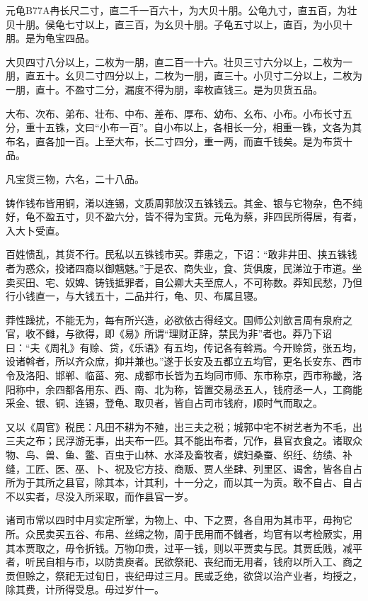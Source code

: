 \documentclass[]{article}
\begin{document}
元龟B77A冉长尺二寸，直二千一百六十，为大贝十朋。公龟九寸，直五百，为壮贝十朋。侯龟七寸以上，直三百，为幺贝十朋。子龟五寸以上，直百，为小贝十朋。是为龟宝四品。

大贝四寸八分以上，二枚为一朋，直二百一十六。壮贝三寸六分以上，二枚为一朋，直五十。幺贝二寸四分以上，二枚为一朋，直三十。小贝寸二分以上，二枚为一朋，直十。不盈寸二分，漏度不得为朋，率枚直钱三。是为贝货五品。

大布、次布、弟布、壮布、中布、差布、厚布、幼布、幺布、小布。小布长寸五分，重十五铢，文曰``小布一百''。自小布以上，各相长一分，相重一铢，文各为其布名，直各加一百。上至大布，长二寸四分，重一两，而直千钱矣。是为布货十品。

凡宝货三物，六名，二十八品。

铸作钱布皆用铜，淆以连锡，文质周郭放汉五铢钱云。其金、银与它物杂，色不纯好，龟不盈五寸，贝不盈六分，皆不得为宝货。元龟为蔡，非四民所得居，有者，入大卜受直。

百姓愦乱，其货不行。民私以五铢钱市买。莽患之，下诏：``敢非井田、挟五铢钱者为惑众，投诸四裔以御魑魅。''于是农、商失业，食、货俱废，民涕泣于市道。坐卖买田、宅、奴婢、铸钱抵罪者，自公卿大夫至庶人，不可称数。莽知民愁，乃但行小钱直一，与大钱五十，二品并行，龟、贝、布属且寝。

莽性躁扰，不能无为，每有所兴造，必欲依古得经文。国师公刘歆言周有泉府之官，收不雠，与欲得，即《易》所谓``理财正辞，禁民为非''者也。莽乃下诏曰：``夫《周礼》有赊、贷，《乐语》有五均，传记各有斡焉。今开赊贷，张五均，设诸斡者，所以齐众庶，抑并兼也。''遂于长安及五都立五均官，更名长安东、西市令及洛阳、邯郸、临菑、宛、成都市长皆为五均同市师、东市称京，西市称畿，洛阳称中，余四都各用东、西、南、北为称，皆置交易丞五人，钱府丞一人，工商能采金、银、铜、连锡，登龟、取贝者，皆自占司市钱府，顺时气而取之。

又以《周官》税民：凡田不耕为不殖，出三夫之税；城郭中宅不树艺者为不毛，出三夫之布；民浮游无事，出夫布一匹。其不能出布者，冗作，县官衣食之。诸取众物、鸟、兽、鱼、鳖、百虫于山林、水泽及畜牧者，嫔妇桑蚕、织纴、纺绩、补缝，工匠、医、巫、卜、祝及它方技、商贩、贾人坐肆、列里区、谒舍，皆各自占所为于其所之县官，除其本，计其利，十一分之，而以其一为贡。敢不自占、自占不以实者，尽没入所采取，而作县官一岁。

诸司市常以四时中月实定所掌，为物上、中、下之贾，各自用为其市平，毋拘它所。众民卖买五谷、布帛、丝绵之物，周于民用而不雠者，均官有以考检厥实，用其本贾取之，毋令折钱。万物卬贵，过平一钱，则以平贾卖与民。其贾氐贱，减平者，听民自相与市，以防贵庾者。民欲祭祀、丧纪而无用者，钱府以所入工、商之贡但赊之，祭祀无过旬日，丧纪毋过三月。民或乏绝，欲贷以治产业者，均授之，除其费，计所得受息。毋过岁什一。
\end{document}
